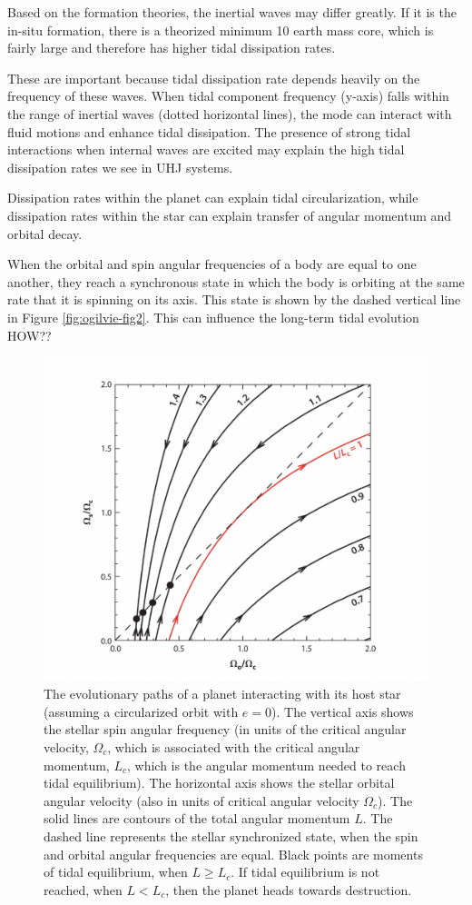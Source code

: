\documentclass[oneside,12pt]{amsart}
\numberwithin{page}{section}
\begin{document}
Based on the formation theories, the inertial waves may differ greatly. If it is the in-situ formation, there is a theorized minimum 10 earth mass core, which is fairly large and therefore has higher tidal dissipation rates. 

These are important because tidal dissipation rate depends heavily on the frequency of these waves. When tidal component frequency (y-axis) falls within the range of inertial waves (dotted horizontal lines), the mode can interact with fluid motions and enhance tidal dissipation. The presence of strong tidal interactions when internal waves are excited may explain the high tidal dissipation rates we see in UHJ systems.

Dissipation rates within the planet can explain tidal circularization, while dissipation rates within the star can explain transfer of angular momentum and orbital decay.

When the orbital and spin angular frequencies of a body are equal to one another, they reach a synchronous state in which the body is orbiting at the same rate that it is spinning on its axis. This state is shown by the dashed vertical line in Figure \ref{fig:ogilvie-fig2}. This can influence the long-term tidal evolution HOW??

\begin{figure}[htbp]
    \centering
    \includegraphics[width=0.8\linewidth]{figs/ogilvie_fig10.png}
    \caption{The evolutionary paths of a planet interacting with its host star (assuming a circularized orbit with $e=0$). The vertical axis shows the stellar spin angular frequency (in units of the critical angular velocity, $\Omega_c$, which is associated with the critical angular momentum, $L_c$, which is the angular momentum needed to reach tidal equilibrium). The horizontal axis shows the stellar orbital angular velocity (also in units of critical angular velocity $\Omega_c$). The solid lines are contours of the total angular momentum $L$. The dashed line represents the stellar synchronized state, when the spin and orbital angular frequencies are equal. Black points are moments of tidal equilibrium, when $L \geq L_c$. If tidal equilibrium is not reached, when $L < L_c$, then the planet heads towards destruction.}
    \label{fig:ogilvie-fig10}
\end{figure}
\end{document}
